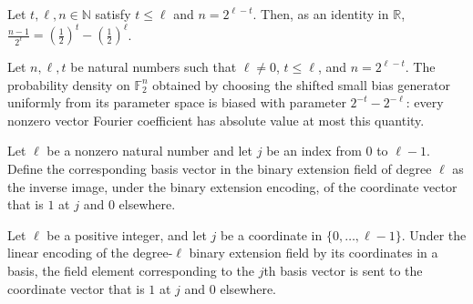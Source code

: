 \begin{theorem}
\label{FABL.shiftedSmallBias_dyadicParameter}
\leanok
{}
Let $t,\ell,n\in\mathbb{N}$ satisfy $t\leq\ell$ and $n=2^{\ell-t}$. Then, as an identity
in $\mathbb{R}$, $\frac{n-1}{2^\ell}=\left(\frac12\right)^t-\left(\frac12\right)^\ell$.
\end{theorem}

\begin{theorem}
\label{FABL.shiftedSmallBiasGeneratorDensity_isBiased_dyadic}
\leanok
{}
Let $n,\ell,t$ be natural numbers such that $\ell\ne0$, $t\le\ell$, and $n=2^{\ell-t}$.
The probability density on $\mathbb F_2^n$ obtained by choosing the shifted small bias
generator uniformly from its parameter space is biased with parameter
$2^{-t}-2^{-\ell}$: every nonzero vector Fourier coefficient has absolute value at most
this quantity.
\end{theorem}

\begin{definition}
\label{FABL.binaryExtensionBasisVector}
\leanok
{}
Let $\ell$ be a nonzero natural number and let $j$ be an index from $0$ to $\ell-1$. Define
the corresponding basis vector in the binary extension field of degree $\ell$ as the
inverse image, under the binary extension encoding, of the coordinate vector that is $1$
at $j$ and $0$ elsewhere.
\end{definition}

\begin{theorem}
\label{FABL.binaryExtensionEncode_basisVector}
\leanok
{}
Let $\ell$ be a positive integer, and let $j$ be a coordinate in $\{0,\ldots,\ell-1\}$.
Under the linear encoding of the degree-$\ell$ binary extension field by its coordinates
in a basis, the field element corresponding to the $j$th basis vector is sent to the
coordinate vector that is $1$ at $j$ and $0$ elsewhere.
\end{theorem}

